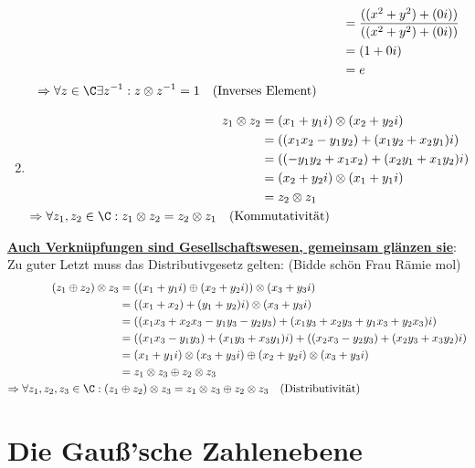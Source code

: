 \documentclass[main.tex]{subfiles}
\begin{document}
\begin{Beweis}
\begin{enumerate}
\begin{align*}
												   &= \dfrac{((x^2 + y^2) + (0i))}{((x^2 + y^2) + (0i))} \\
											  	   &= (1 + 0i) \\
											  	   &= e \\
						\Rightarrow \forall z \in \C \exists z^{-1}: z \otimes z^{-1} = 1 \quad \text{(Inverses Element)} \qquad &
	  			  \end{align*}
			\item \begin{align*}
						z_1 \otimes z_2 &= (x_1 + y_1i) \otimes (x_2 + y_2i) \\
									    &= ((x_1x_2 - y_1y_2) + (x_1y_2 + x_2y_1)i) \\
									    &= ((- y_1y_2 + x_1x_2) + (x_2y_1 + x_1y_2)i) \\
									    &= (x_2 + y_2i) \otimes (x_1 + y_1i) \\
									    &= z_2 \otimes z_1 \\
						\Rightarrow \forall z_1, z_2 \in \C: z_1 \otimes z_2 = z_2 \otimes z_1 \quad \text{(Kom}&\text{mutativität)}
				  \end{align*}
		\end{enumerate}
		\newpage
		\underline{\textbf{Auch Verknüpfungen sind Gesellschaftswesen, gemeinsam glänzen sie}}:
		Zu guter Letzt muss das Distributivgesetz gelten: (Bidde schön Frau Rämie mol)
			\begin{align*}
				(z_1 \oplus z_2) \otimes z_3 &= ((x_1 + y_1i) \oplus (x_2 + y_2i)) \otimes (x_3 + y_3i) \\
											 &= ((x_1 + x_2) +  (y_1 + y_2)i) \otimes (x_3 + y_3i) \\
											 &= ((x_1x_3 + x_2x_3 - y_1y_3 - y_2y_3) + (x_1y_3 + x_2y_3 + y_1x_3 + y_2x_3)i) \\
											 &= ((x_1x_3 - y_1y_3) + (x_1y_3 + x_3y_1)i) + ((x_2x_3 - y_2y_3) + (x_2y_3 + x_3y_2)i) \\
											 &= (x_1 + y_1i) \otimes (x_3 + y_3i) \oplus (x_2 + y_2i) \otimes (x_3 + y_3i) \\
											 &= z_1 \otimes z_3 \oplus z_2 \otimes z_3 \\
			\Rightarrow \forall z_1, z_2, z_3 \in \C: (z_1 &\oplus z_2) \otimes z_3 = z_1 \otimes z_3 \oplus z_2 \otimes z_3 \quad \text{(Distributivität)}
			\end{align*}
	\end{Beweis}


\section{Die Gauß'sche Zahlenebene}
\end{document}
